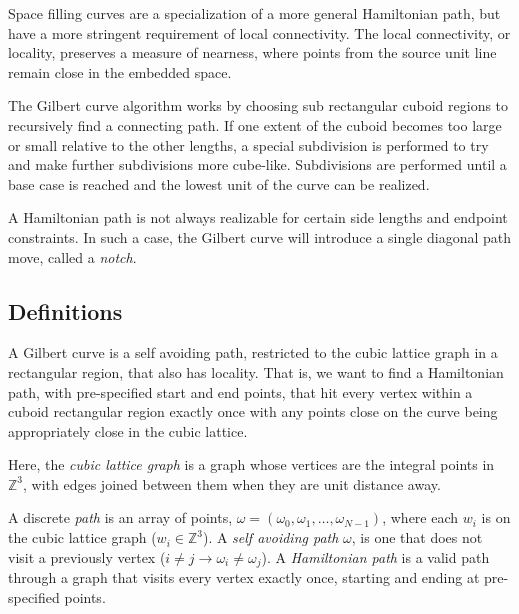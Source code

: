 Space filling curves are a specialization of a more general Hamiltonian path,
but have a more stringent requirement of local connectivity.
The local connectivity, or locality, preserves a measure of nearness, where
points from the source unit line remain close in the embedded space.

%



The Gilbert curve algorithm works by choosing sub rectangular cuboid regions
to recursively find a connecting path.
If one extent of the cuboid becomes too large or small relative to the other lengths,
a special subdivision is performed to try and make further subdivisions more cube-like.
Subdivisions are performed until a base case is reached and the lowest unit of the curve
can be realized.

A Hamiltonian path is not always realizable for certain side lengths and endpoint constraints.
In such a case, the Gilbert curve will introduce a single diagonal path move, called a \textit{notch}.


\subsection{Definitions}

A Gilbert curve is %
a self avoiding path,
restricted to the cubic lattice graph in a rectangular region, that also has locality.
That is, we want to find a Hamiltonian path, with pre-specified start and end points, that hit
every vertex within a cuboid rectangular region exactly once with any points close on the curve
being appropriately close in the cubic lattice.

Here, the \textit{cubic lattice graph} is a graph
whose vertices are the integral points in $\mathbb{Z}^3$, with edges joined between them when they
are unit distance away.

A discrete \textit{path} is an array of points, $\omega = (\omega_0, \omega_1, \dots, \omega_{N-1})$, where each $w_i$ is on the
cubic lattice graph ($w_i \in \mathbb{Z}^3$).
A \textit{self avoiding path} $\omega$, is one that does not visit a previously vertex ($i \ne j \to \omega_i \ne \omega_j$).
A \textit{Hamiltonian path} is a valid path through a graph that visits every vertex exactly once, starting
and ending at pre-specified points.

